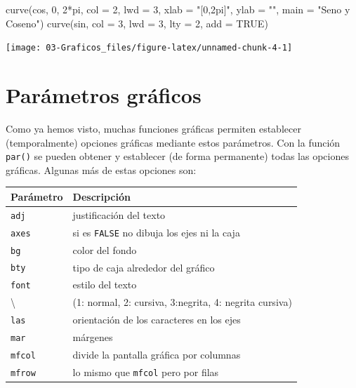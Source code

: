 \documentclass[
]{book}
\newenvironment{Shaded}{\begin{snugshade}}{\end{snugshade}}
\newcommand{\AttributeTok}[1]{\textcolor[rgb]{0.77,0.63,0.00}{#1}}
\newcommand{\ConstantTok}[1]{\textcolor[rgb]{0.00,0.00,0.00}{#1}}
\newcommand{\DecValTok}[1]{\textcolor[rgb]{0.00,0.00,0.81}{#1}}
\newcommand{\FunctionTok}[1]{\textcolor[rgb]{0.00,0.00,0.00}{#1}}
\newcommand{\NormalTok}[1]{#1}
\newcommand{\SpecialCharTok}[1]{\textcolor[rgb]{0.00,0.00,0.00}{#1}}
\newcommand{\StringTok}[1]{\textcolor[rgb]{0.31,0.60,0.02}{#1}}
\theoremstyle{break}
\begin{document}
\begin{Shaded}
\begin{Highlighting}[]
\FunctionTok{curve}\NormalTok{(cos, }\DecValTok{0}\NormalTok{, }\DecValTok{2}\SpecialCharTok{*}\NormalTok{pi, }\AttributeTok{col =} \DecValTok{2}\NormalTok{, }\AttributeTok{lwd =} \DecValTok{3}\NormalTok{, }
      \AttributeTok{xlab =} \StringTok{"[0,2pi]"}\NormalTok{, }\AttributeTok{ylab =} \StringTok{""}\NormalTok{, }\AttributeTok{main =} \StringTok{"Seno y Coseno"}\NormalTok{)}
\FunctionTok{curve}\NormalTok{(sin, }\AttributeTok{col =} \DecValTok{3}\NormalTok{, }\AttributeTok{lwd =} \DecValTok{3}\NormalTok{, }\AttributeTok{lty =} \DecValTok{2}\NormalTok{, }\AttributeTok{add =} \ConstantTok{TRUE}\NormalTok{)}
\end{Highlighting}
\end{Shaded}

\begin{center}\texttt{[image: 03-Graficos\_files/figure-latex/unnamed-chunk-4-1]} \end{center}

\hypertarget{paruxe1metros-gruxe1ficos}{%
\section{Parámetros gráficos}\label{paruxe1metros-gruxe1ficos}}

Como ya hemos visto, muchas funciones gráficas permiten establecer (temporalmente)
opciones gráficas mediante estos parámetros.
Con la función \texttt{par()} se pueden obtener y establecer (de forma permanente) todas las opciones gráficas.
Algunas más de estas opciones son:

\begin{longtable}[]{@{}ll@{}}
\toprule
Parámetro & Descripción \\
\midrule
\endhead
\texttt{adj} & justificación del texto \\
\texttt{axes} & si es \texttt{FALSE} no dibuja los ejes ni la caja \\
\texttt{bg} & color del fondo \\
\texttt{bty} & tipo de caja alrededor del gráfico \\
\texttt{font} & estilo del texto \\
\textbackslash{} & (1: normal, 2: cursiva, 3:negrita, 4: negrita cursiva) \\
\texttt{las} & orientación de los caracteres en los ejes \\
\texttt{mar} & márgenes \\
\texttt{mfcol} & divide la pantalla gráfica por columnas \\
\texttt{mfrow} & lo mismo que \texttt{mfcol} pero por filas \\
\bottomrule
\end{longtable}
\end{document}
